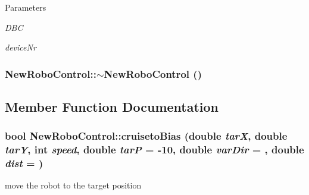 \begin{DoxyParams}{Parameters}
\item[{\em DBC}]\item[{\em deviceNr}]\end{DoxyParams}
\hypertarget{classNewRoboControl_ae63cbd6c60d37882d176e9e7d60b11ba}{
\subsubsection[{$\sim$NewRoboControl}]{\setlength{\rightskip}{0pt plus 5cm}NewRoboControl::$\sim$NewRoboControl ()}}
\label{classNewRoboControl_ae63cbd6c60d37882d176e9e7d60b11ba}


\subsection{Member Function Documentation}
\hypertarget{classNewRoboControl_a30944b8982d85ab2ee83fd248b731bc0}{
\subsubsection[{cruisetoBias}]{\setlength{\rightskip}{0pt plus 5cm}bool NewRoboControl::cruisetoBias (double {\em tarX}, \/  double {\em tarY}, \/  int {\em speed}, \/  double {\em tarP} = {\ttfamily -\/10}, \/  double {\em varDir} = {}, \/  double {\em dist} = {})}}
\label{classNewRoboControl_a30944b8982d85ab2ee83fd248b731bc0}


move the robot to the target position 



